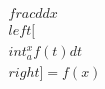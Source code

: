 \documentclass[preview]{standalone}
\begin{document}
\begin{align*}
\quad\\frac{d}{dx} \quad\\left[ \quad\\int_a^x f(t)dt \quad\\right] = f(x)
\end{align*}
\end{document}
